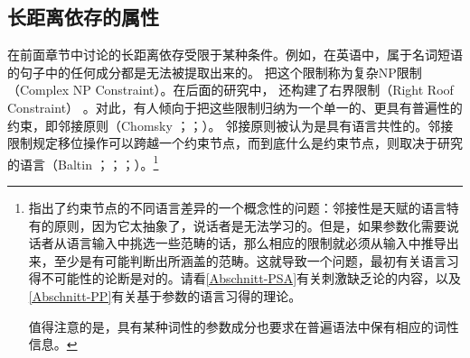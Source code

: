 \subsection{长距离依存的属性}
\label{Abschnitt-Fernabhängigkeiten}

在前面章节中讨论的长距离依存受限于某种条件。例如，在英语中，属于名词短语的句子中的任何成分都是无法被提取出来的。 \citet[]{Ross67}把这个限制称为复杂NP限制（Complex NP Constraint）。在后面的研究中， \citet[\S~5.1.2]{Ross67}还构建了右界限制（Right Roof Constraint）
。对此，有人倾向于把这些限制归纳为一个单一的、更具有普遍性的约束，即邻接原则（Chomsky \citeyear[]{Chomsky73a}；\citeyear[]{Chomsky86b}；\citealp{Baltin81a,Baltin2006a}）。
邻接原则被认为是具有语言共性的。邻接限制规定移位操作可以跨越一个约束节点，而到底什么是约束节点，则取决于研究的语言（Baltin \citeyear[]{Baltin81a}；\citeyear{Baltin2006a}；\citealp[]{Rizzi82b}；\citealp[--40]{Chomsky86b}）。\footnote{%
 \citet[--540]{Newmeyer2004a}指出了约束节点的不同语言差异的一个概念性的问题：邻接性是天赋的语言特有的原则，因为它太抽象了，说话者是无法学习的。但是，如果参数化需要说话者从语言输入中挑选一些范畴的话，那么相应的限制就必须从输入中推导出来，至少是有可能判断出所涵盖的范畴。这就导致一个问题，最初有关语言习得不可能性的论断是对的。请看\ref{Abschnitt-PSA}有关刺激缺乏论的内容，以及\ref{Abschnitt-PP}有关基于参数的语言习得的理论。

值得注意的是，具有某种词性的参数成分也要求在普遍语法中保有相应的词性信息。
}
